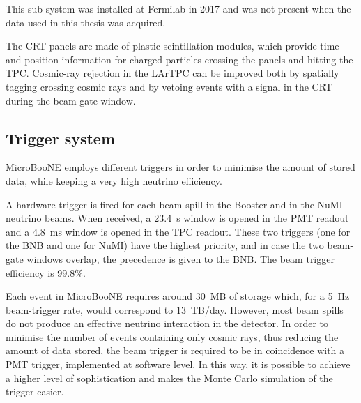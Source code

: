This sub-system was installed at Fermilab in 2017 and was not present when the data used in this thesis was acquired. 

The CRT panels are made of plastic scintillation modules, which provide time and position information for charged particles crossing the panels and hitting the TPC.
Cosmic-ray rejection in the LArTPC can be improved both by spatially tagging crossing cosmic rays and by vetoing events with a signal in the CRT during the beam-gate window. 

\subsection{Trigger system}\label{sec:trigger}
MicroBooNE employs different triggers in order to minimise the amount of stored data, while keeping a very high neutrino efficiency.

A hardware trigger is fired for each beam spill in the Booster and in the NuMI neutrino beams. When received, a 23.4~\si{\micro}s window is opened in the PMT readout and a 4.8~ms window is opened in the TPC readout. These two triggers (one for the BNB and one for NuMI) have the highest priority, and in case the two beam-gate windows overlap, the precedence is given to the BNB. The beam trigger efficiency is 99.8\%.

Each event in MicroBooNE requires around 30~MB of storage which, for a 5~Hz beam-trigger rate, would correspond to 13~TB/day. However, most beam spills do not produce an effective neutrino interaction in the detector. In order to minimise the number of events containing only cosmic rays, thus reducing the amount of data stored, the beam trigger is required to be in coincidence with a PMT trigger, implemented at software level. In this way, it is possible to achieve a higher level of sophistication and makes the Monte Carlo simulation of the trigger easier. 

